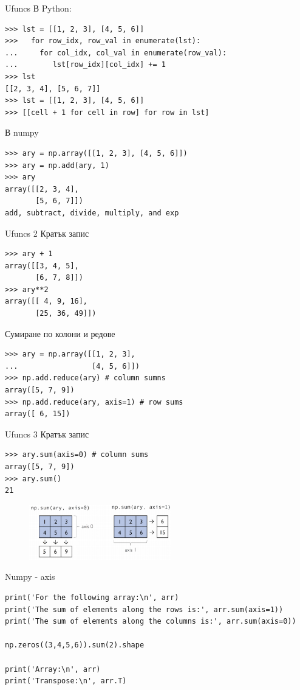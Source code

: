 \documentclass{beamer}
\begin{document}
\begin{frame}[fragile]{Ufuncs}
В Python:
\begin{verbatim}
>>> lst = [[1, 2, 3], [4, 5, 6]]
>>>   for row_idx, row_val in enumerate(lst):
...     for col_idx, col_val in enumerate(row_val):
...        lst[row_idx][col_idx] += 1
>>> lst
[[2, 3, 4], [5, 6, 7]]
>>> lst = [[1, 2, 3], [4, 5, 6]]
>>> [[cell + 1 for cell in row] for row in lst]
\end{verbatim}
В numpy
\begin{verbatim}
>>> ary = np.array([[1, 2, 3], [4, 5, 6]])
>>> ary = np.add(ary, 1)
>>> ary
array([[2, 3, 4],
       [5, 6, 7]])
add, subtract, divide, multiply, and exp
\end{verbatim}
\end{frame}

\begin{frame}[fragile]{Ufuncs 2}
Кратък запис
\begin{verbatim}
>>> ary + 1
array([[3, 4, 5],
       [6, 7, 8]])
>>> ary**2
array([[ 4, 9, 16],
       [25, 36, 49]])
\end{verbatim}       
Сумиране по колони и редове
\begin{verbatim}
>>> ary = np.array([[1, 2, 3],
...                 [4, 5, 6]])
>>> np.add.reduce(ary) # column sumns
array([5, 7, 9])
>>> np.add.reduce(ary, axis=1) # row sums
array([ 6, 15])
\end{verbatim}
\end{frame}

\begin{frame}[fragile]{Ufuncs 3}
Кратък запис
\begin{verbatim}
>>> ary.sum(axis=0) # column sums
array([5, 7, 9])
>>> ary.sum()
21
\end{verbatim}
\begin{figure}
    \centering
    \includegraphics[width=0.55\textwidth]{np3.png}
\end{figure}
\end{frame}

\begin{frame}[fragile]{Numpy - axis }
\begin{lstlisting}
print('For the following array:\n', arr)
print('The sum of elements along the rows is:', arr.sum(axis=1))
print('The sum of elements along the columns is:', arr.sum(axis=0))

np.zeros((3,4,5,6)).sum(2).shape

print('Array:\n', arr)
print('Transpose:\n', arr.T)
\end{lstlisting}

\end{frame}
\end{document}
